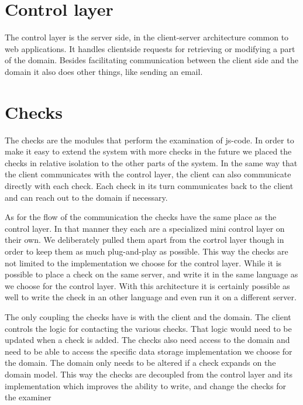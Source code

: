 \section{Control layer}
The control layer is the server side,
in the client-server architecture common to web applications.
It handles clientside requests
for retrieving or modifying a part of the domain.
Besides facilitating communication between the client side and the domain
it also does other things, like sending an email.

\section{Checks}
The checks are the modules that perform the examination of \gls{js-code}.
In order to make it easy to extend the system with more checks in the future
we placed the checks in relative isolation to the other parts of the system.
In the same way that the client communicates with the control layer,
the client can also communicate directly with each check.
Each check in its turn communicates back to the client
and can reach out to the domain if necessary.

As for the flow of the communication
the checks have the same place as the control layer.
In that manner they each are a specialized mini control layer on their own.
We deliberately pulled them apart from the cortrol layer though
in order to keep them as much plug-and-play as possible.
This way the checks are not limited
to the implementation we choose for the control layer.
While it is possible to place a check on the same server,
and write it in the same language as we choose for the control layer.
With this architecture it is certainly possible as well
to write the check in an other language
and even run it on a different server.

The only coupling the checks have is with the client and the domain.
The client controls the logic for contacting the various checks.
That logic would need to be updated when a check is added.
The checks also need access to the domain
and need to be able to access
the specific data storage implementation we choose for the domain.
The domain only needs to be altered if a check expands on the domain model.
This way the checks are decoupled from the control layer
and its implementation
which improves the ability to write,
and change the checks for the \gls{examiner}

